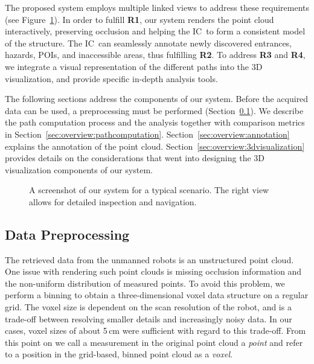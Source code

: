 \documentclass{egpubl}
\def\IC{IC}
\begin{document}
The proposed system employs multiple linked views to address these requirements (see Figure~\ref{sec:overview:system}). In order to fulfill {\bfseries R1}, our system renders the point cloud interactively, preserving occlusion and helping the \IC\ to form a consistent model of the structure. The \IC\ can seamlessly annotate newly discovered entrances, hazards, POIs, and inaccessible areas, thus fulfilling {\bfseries R2}. To address {\bfseries R3} and {\bfseries R4}, we integrate a visual representation of the different paths into the 3D visualization, and provide specific in-depth analysis tools.

The following sections address the components of our system. Before the acquired data can be used, a preprocessing must be performed (Section~\ref{sec:overview:preprocessing}). We describe the path computation process and the analysis together with comparison metrics in Section~\ref{sec:overview:pathcomputation}. Section~\ref{sec:overview:annotation} explains the annotation of the point cloud. Section~\ref{sec:overview:3dvisualization} provides details on the considerations that went into designing the 3D visualization components of our system.

\begin{figure}
    \centering
    \caption{A screenshot of our system for a typical scenario. The right view allows for detailed inspection and navigation.}
    \label{sec:overview:system}
\end{figure}


\subsection{Data Preprocessing} \label{sec:overview:preprocessing}
The retrieved data from the unmanned robots is an unstructured point cloud. One issue with rendering such point clouds is missing occlusion information and the non-uniform distribution of measured points. To avoid this problem, we perform a binning to obtain a three-dimensional voxel data structure on a regular grid. The voxel size is dependent on the scan resolution of the robot, and is a trade-off between resolving smaller details and increasingly noisy data. In our cases, voxel sizes of about 5\,cm were sufficient with regard to this trade-off. From this point on we call a measurement in the original point cloud a \emph{point} and refer to a position in the grid-based, binned point cloud as a \emph{voxel}.
\end{document}
